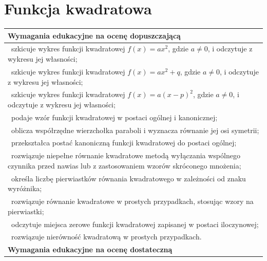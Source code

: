 \documentclass[12pt,a4paper]{article}
\begin{document}
	\section{Funkcja kwadratowa}
	
	\begin{longtable}{|p{16cm}|}
		\hline
		
		\textbf{Wymagania edukacyjne na ocenę dopuszczającą} \\ \hline
		
		\textbullet\ szkicuje wykres funkcji kwadratowej $f(x)=ax^2$, gdzie $a\neq 0$, i odczytuje z wykresu jej własności; \\
		
		\textbullet\ szkicuje wykres funkcji kwadratowej $f(x)=ax^2+q$, gdzie $a\neq 0$, i odczytuje z wykresu jej własności; \\
		
		\textbullet\ szkicuje wykres funkcji kwadratowej $f(x)=a(x-p)^2$, gdzie $a\neq 0$, i odczytuje z wykresu jej własności; \\
		
		\textbullet\ podaje wzór funkcji kwadratowej w postaci ogólnej i kanonicznej; \\
		
		\textbullet\ oblicza współrzędne wierzchołka paraboli i wyznacza równanie jej osi symetrii; \\
		
		\textbullet\ przekształca postać kanoniczną funkcji kwadratowej do postaci ogólnej; \\
		
		\textbullet\ rozwiązuje niepełne równanie kwadratowe metodą wyłączania wspólnego czynnika przed nawias lub z zastosowaniem wzorów skróconego mnożenia; \\
		
		\textbullet\ określa liczbę pierwiastków równania kwadratowego w zależności od znaku wyróżnika; \\
		
		\textbullet\ rozwiązuje równanie kwadratowe w prostych przypadkach, stosując wzory na pierwiastki; \\
		
		\textbullet\ odczytuje miejsca zerowe funkcji kwadratowej zapisanej w postaci iloczynowej; \\
		
		\textbullet\ rozwiązuje nierówność kwadratową w prostych przypadkach. \\ \hline
		
		\textbf{Wymagania edukacyjne na ocenę dostateczną} \\ \hline
		

\end{longtable}
\end{document}
